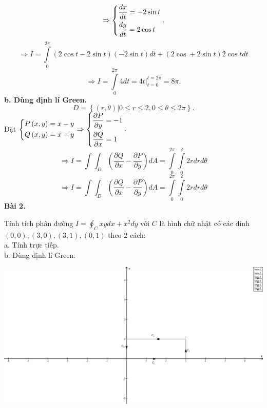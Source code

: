 \documentclass[12pt,a4paper]{article}
\begin{document}
\[ \Rightarrow \left\{ \begin{gathered}
  \frac{{dx}}{{dt}} =  - 2\sin t \hfill \\
  \frac{{dy}}{{dt}} = 2\cos t \hfill \\ 
\end{gathered}  \right..\]
\[ \Rightarrow I = \int\limits_0^{2\pi } {\left( {2\cos t - 2\sin t} \right)\left( { - 2\sin t} \right)dt + \left( {2\cos  + 2\sin t} \right)2\cos tdt} \]
\[ \Rightarrow I = \int\limits_0^{2\pi } {4dt}  = \left. {4t} \right|_{t = 0}^{t = 2\pi } = 8\pi .\]
\textbf{b. Dùng định lí Green.}
\[D = \left\{ {\left. {\left( {r,\theta } \right)} \right|0 \leqslant r \leqslant 2,0 \leqslant \theta  \leqslant 2\pi } \right\}.\]
Đặt \(\left\{ \begin{gathered}
  P\left( {x,y} \right) = x - y \hfill \\
  Q\left( {x,y} \right) = x + y \hfill \\ 
\end{gathered}  \right. \Rightarrow \left\{ \begin{gathered}
  \frac{{\partial P}}{{\partial y}} =  - 1 \hfill \\
  \frac{{\partial Q}}{{\partial x}} = 1 \hfill \\ 
\end{gathered}  \right..\)
\[ \Rightarrow I = \int {\int_D {\left( {\frac{{\partial Q}}{{\partial x}} - \frac{{\partial P}}{{\partial y}}} \right)} } dA = \int\limits_0^{2\pi } {\int\limits_0^2 {2rdrd\theta } } \]
\[ \Rightarrow I = \int {\int_D {\left( {\frac{{\partial Q}}{{\partial x}} - \frac{{\partial P}}{{\partial y}}} \right)} } dA = \int\limits_0^{2\pi } {\int\limits_0^2 {2rdrd\theta } } \]
\textbf{Bài 2.}
\begin{mybox}
Tính tích phân đường \(I = \oint_C {xydx + {x^2}dy} \) với \(C\) là hình chữ nhật có các đỉnh \(\left( {0,0} \right),\left( {3,0} \right),\left( {3,1} \right),\left( {0,1} \right)\) theo 2 cách:\\
a. Tính trực tiếp.\\
b. Dùng định lí Green.
\end{mybox}
\begin{center}
	\includegraphics[scale=0.3]{c4_7}
\end{center}
\end{document}

